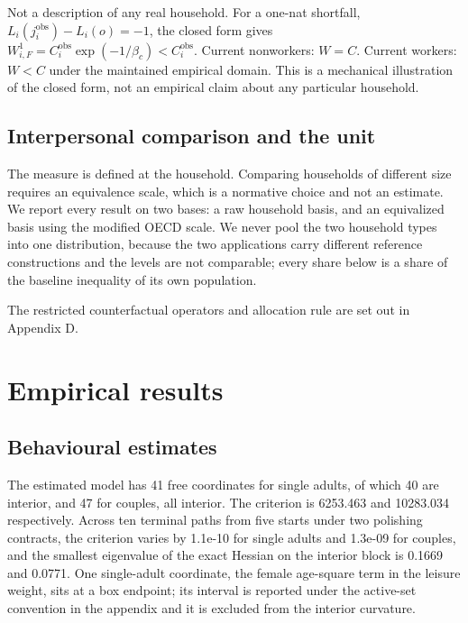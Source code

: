 \documentclass[11pt,a4paper]{article}
\begin{document}
Not a description of any real household. For a one-nat shortfall, \(L_i(j_i^{\mathrm{obs}})-L_i(o)=-1\), the closed form gives \(W^1_{i,F}=C_i^{\mathrm{obs}}\exp(-1/\beta_c)<C_i^{\mathrm{obs}}\). Current nonworkers: \(W=C\). Current workers: \(W<C\) under the maintained empirical domain. This is a mechanical illustration of the closed form, not an empirical claim about any particular household.

\subsection{Interpersonal comparison and the unit}\label{interpersonal-comparison-and-the-unit}

The measure is defined at the household. Comparing households of different size requires an equivalence scale, which is a normative choice and not an estimate. We report every result on two bases: a raw household basis, and an equivalized basis using the modified OECD scale. We never pool the two household types into one distribution, because the two applications carry different reference constructions and the levels are not comparable; every share below is a share of the baseline inequality of its own population.

The restricted counterfactual operators and allocation rule are set out in Appendix D.

\section{Empirical results}\label{empirical-results}

\subsection{Behavioural estimates}\label{behavioural-estimates}

The estimated model has 41 free coordinates for single adults, of which 40 are interior, and 47 for couples, all interior. The criterion is 6253.463 and 10283.034 respectively. Across ten terminal paths from five starts under two polishing contracts, the criterion varies by 1.1e-10 for single adults and 1.3e-09 for couples, and the smallest eigenvalue of the exact Hessian on the interior block is 0.1669 and 0.0771. One single-adult coordinate, the female age-square term in the leisure weight, sits at a box endpoint; its interval is reported under the active-set convention in the appendix and it is excluded from the interior curvature.
\end{document}
